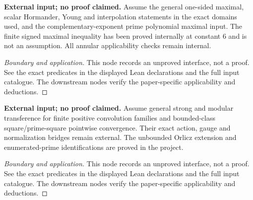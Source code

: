 \begin{lemma}
\label{input_real_variable}
\textbf{External input; no proof claimed.} Assume the general one-sided maximal, scalar Hormander, Young and interpolation statements in the exact domains used, and the complementary-exponent prime polynomial maximal input. The finite signed maximal inequality has been proved internally at constant $6$ and is not an assumption. All annular applicability checks remain internal.
\end{lemma}
\begin{proof}[Boundary and application]
This node records an unproved interface, not a proof. See the exact predicates in the displayed Lean declarations and the full input catalogue. The downstream nodes verify the paper-specific applicability and deductions.
\end{proof}

\begin{lemma}
\label{input_ergodic}
\textbf{External input; no proof claimed.} Assume general strong and modular transference for finite positive convolution families and bounded-class square/prime-square pointwise convergence. Their exact action, gauge and normalization bridges remain external. The unbounded Orlicz extension and enumerated-prime identifications are proved in the project.
\end{lemma}
\begin{proof}[Boundary and application]
This node records an unproved interface, not a proof. See the exact predicates in the displayed Lean declarations and the full input catalogue. The downstream nodes verify the paper-specific applicability and deductions.
\end{proof}

